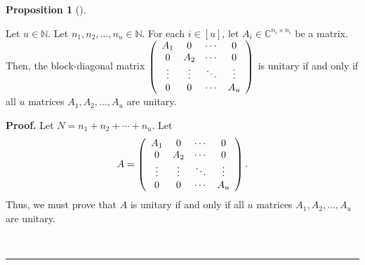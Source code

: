 \documentclass[numbers=enddot,12pt,final,onecolumn,notitlepage]{scrartcl}%
\numberwithin{exer}{subsection}
\theoremstyle{definition}
\newtheorem{prop}[theo]{Proposition}
\newenvironment{proposition}[1][]
{\begin{prop}[#1]\begin{leftbar}}
{\end{leftbar}\end{prop}}
\newenvironment{proof}[1][Proof]{\noindent\textbf{#1.} }{\ \rule{0.5em}{0.5em}}
\begin{document}
\begin{proposition}
\label{prop.blockmatrix.unitary-diag}Let $u\in\mathbb{N}$. Let $n_{1}%
,n_{2},\ldots,n_{u}\in\mathbb{N}$. For each $i\in\left[  u\right]  $, let
$A_{i}\in\mathbb{C}^{n_{i}\times n_{i}}$ be a matrix. Then, the block-diagonal
matrix $\left(
\begin{array}
[c]{cccc}%
A_{1} & 0 & \cdots & 0\\
0 & A_{2} & \cdots & 0\\
\vdots & \vdots & \ddots & \vdots\\
0 & 0 & \cdots & A_{u}%
\end{array}
\right)  $ is unitary if and only if all $u$ matrices $A_{1},A_{2}%
,\ldots,A_{u}$ are unitary.
\end{proposition}

\begin{proof}
Let $N=n_{1}+n_{2}+\cdots+n_{u}$. Let
\begin{equation}
A=\left(
\begin{array}
[c]{cccc}%
A_{1} & 0 & \cdots & 0\\
0 & A_{2} & \cdots & 0\\
\vdots & \vdots & \ddots & \vdots\\
0 & 0 & \cdots & A_{u}%
\end{array}
\right)  . \label{pf.prop.blockmatrix.unitary-diag.A=}%
\end{equation}
Thus, we must prove that $A$ is unitary if and only if all $u$ matrices
$A_{1},A_{2},\ldots,A_{u}$ are unitary.


\end{proof}
\end{document}

